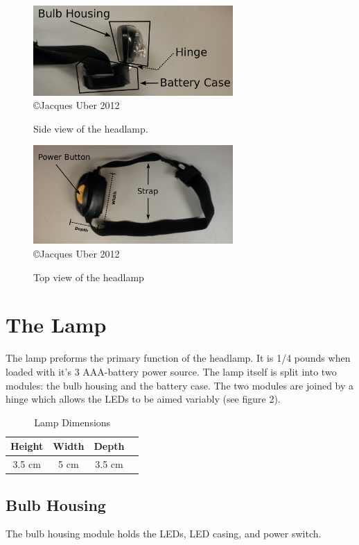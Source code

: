 \documentclass[12pt]{article}
\begin{document}
\begin{figure}[h!]
\centering
\caption[Side view of the headlamp] {Side view of the headlamp.}
\includegraphics[width=3in]{headlamp_side}
\\ {\tiny \copyright  Jacques Uber 2012}
\end{figure}

\begin{figure}[h!]
\centering
\caption[Top view of the headlamp] {Top view of the headlamp}
\includegraphics[width=3in]{headlamp_top}
\\ {\tiny \copyright  Jacques Uber 2012}
\end{figure}

\section{The Lamp}
The lamp preforms the primary function of the headlamp. It is 1/4 pounds when loaded with
it's 3 AAA-battery power source. The lamp itself is split into two modules: the bulb housing and the
battery case. The two modules are joined by a hinge which allows the LEDs to be aimed variably (see
figure 2).

\begin{table}[h!]
\begin{center}
\begin{tabular}{ | c | c | c | p{5cm} |}
    \hline
    Height & Width & Depth \\ \hline
    3.5 cm & 5 cm & 3.5 cm  \\ \hline
\end{tabular}
\end{center}
\caption{Lamp Dimensions}
\end{table}

\subsection{Bulb Housing}
The bulb housing module holds the LEDs, LED casing, and power switch.
\end{document}
